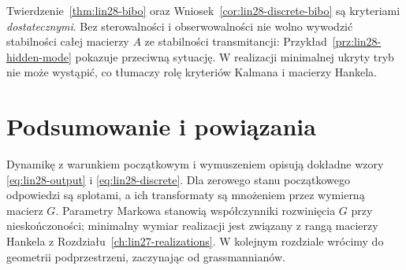 \begin{uwaga}
\label{rem:lin28-hidden-stability}
Twierdzenie~\ref{thm:lin28-bibo} oraz
Wniosek~\ref{cor:lin28-discrete-bibo}
są kryteriami \emph{dostatecznymi}.
Bez sterowalności i obserwowalności
nie wolno wywodzić stabilności całej
macierzy \(A\) ze stabilności transmitancji:
Przykład~\ref{prz:lin28-hidden-mode}
pokazuje przeciwną sytuację.
W realizacji minimalnej ukryty tryb
nie może wystąpić, co tłumaczy rolę
kryteriów Kalmana i macierzy Hankela.
\end{uwaga}

\section{Podsumowanie i powiązania}
\label{sec:lin28-summary}
Dynamikę z warunkiem początkowym
i wymuszeniem opisują dokładne wzory
\eqref{eq:lin28-output} i
\eqref{eq:lin28-discrete}. Dla zerowego
stanu początkowego odpowiedzi są splotami,
a ich transformaty są mnożeniem przez
wymierną macierz \(G\).
Parametry Markowa stanowią współczynniki
rozwinięcia \(G\) przy nieskończoności;
minimalny wymiar realizacji jest związany
z rangą macierzy Hankela z
Rozdziału~\ref{ch:lin27-realizations}.
W kolejnym rozdziale wrócimy
do geometrii podprzestrzeni,
zaczynając od grassmannianów.
